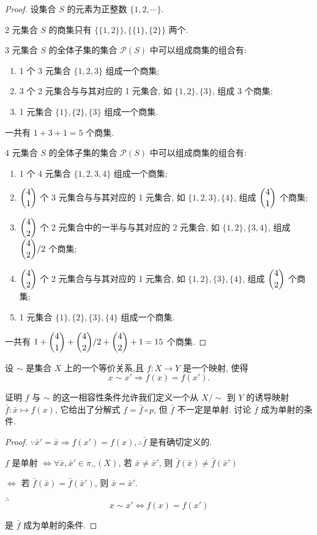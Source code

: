 \documentclass{ctexart}
\begin{document}
\begin{proof}
    设集合 $S$ 的元素为正整数 $\{1,2,\cdots\}$.

    2 元集合 $S$ 的商集只有 $\{\{1,2\}\},\{\{1\},\{2\}\}$ 两个.

    3 元集合 $S$ 的全体子集的集合 $\mathcal{P}(S)$ 中可以组成商集的组合有:
    \begin{enumerate}
        \item 1 个 3 元集合 $\{1,2,3\}$ 组成一个商集;
        \item 3 个 2 元集合与与其对应的 1 元集合, 如 $\{1,2\},\{3\}$, 组成 3 个商集;
        \item 1 元集合 $\{1\},\{2\},\{3\}$ 组成一个商集.
    \end{enumerate}

    一共有 $1+3+1=5$ 个商集.

    4 元集合 $S$ 的全体子集的集合 $\mathcal{P}(S)$ 中可以组成商集的组合有:
    \begin{enumerate}
        \item 1 个 4 元集合 $\{1,2,3,4\}$ 组成一个商集;
        \item $\dbinom{4}{1}$ 个 3 元集合与与其对应的 1 元集合, 如 $\{1,2,3\},\{4\}$, 组成 $\dbinom{4}{1}$ 个商集;
        \item $\dbinom{4}{2}$ 个 2 元集合中的一半与与其对应的 2 元集合, 如 $\{1,2\},\{3,4\}$, 组成 $\dbinom{4}{2}/2$ 个商集;
        \item $\dbinom{4}{2}$ 个 2 元集合与与其对应的 1 元集合, 如 $\{1,2\},\{3\},\{4\}$, 组成 $\dbinom{4}{2}$ 个商集;
        \item 1 元集合 $\{1\},\{2\},\{3\},\{4\}$ 组成一个商集.
    \end{enumerate}

    一共有 $1+\dbinom{4}{1}+\dbinom{4}{2}/2+\dbinom{4}{2}+1=15$ 个商集.
\end{proof}
\begin{exercise}[6.4]
    设 $\sim$ 是集合 $X$ 上的一个等价关系,且 $f:X\to Y$ 是一个映射, 使得
    \[x\sim x'\Rightarrow f(x)=f(x').\]

    证明 $f$ 与 $\sim$ 的这一相容性条件允许我们定义一个从 $X/\sim$ 到 $Y$ 的诱导映射 $\bar{f}:\bar{x}\mapsto f(x)$, 它给出了分解式 $f=\bar{f}\circ p$, 但 $\bar{f}$ 不一定是单射. 讨论 $\bar{f}$ 成为单射的条件.
\end{exercise}
\begin{proof}
    $\because\bar{x}'=\bar{x}\Rightarrow f(x')=f(x),\therefore\bar{f}$ 是有确切定义的.

    $f$ 是单射 $\Leftrightarrow\forall\bar{x},\bar{x}'\in\pi_\sim(X)$, 若 $\bar{x}\neq\bar{x}'$, 则 $\bar{f}(\bar{x})\neq\bar{f}(\bar{x}')$

    $\Leftrightarrow$ 若 $\bar{f}(\bar{x})=\bar{f}(\bar{x}')$, 则 $\bar{x}=\bar{x}'$.

    $\therefore$
    \[x\sim x'\Leftrightarrow f(x)=f(x')\]

    是 $\bar{f}$ 成为单射的条件.
\end{proof}
\end{document}
